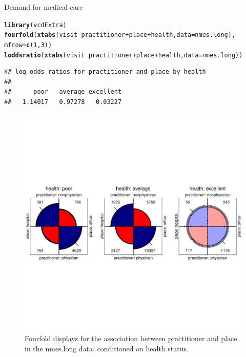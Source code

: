 \documentclass[11pt]{book}\usepackage[]{graphicx}\usepackage[]{color}
\makeatletter
\newcommand{\hlnum}[1]{\textcolor[rgb]{0.686,0.059,0.569}{#1}}%
\newcommand{\hlopt}[1]{\textcolor[rgb]{0,0,0}{#1}}%
\newcommand{\hlstd}[1]{\textcolor[rgb]{0.345,0.345,0.345}{#1}}%
\newcommand{\hlkwc}[1]{\textcolor[rgb]{0.333,0.667,0.333}{#1}}%
\newcommand{\hlkwd}[1]{\textcolor[rgb]{0.737,0.353,0.396}{\textbf{#1}}}%
\newenvironment{kframe}{%
 \def\at@end@of@kframe{}%
 \ifinner\ifhmode%
  \def\at@end@of@kframe{\end{minipage}}%
  \begin{minipage}{\columnwidth}%
 \fi\fi%
 \def\FrameCommand##1{\hskip\@totalleftmargin \hskip-\fboxsep
 \colorbox{shadecolor}{##1}\hskip-\fboxsep
     \hskip-\linewidth \hskip-\@totalleftmargin \hskip\columnwidth}%
 \MakeFramed {\advance\hsize-\width
   \@totalleftmargin\z@ \linewidth\hsize
   \@setminipage}}%
 {\par\unskip\endMakeFramed%
 \at@end@of@kframe}
\newenvironment{knitrout}{}{} %
\renewenvironment{knitrout}{\small\renewcommand{\baselinestretch}{.85}}{} %
\makeatother
\begin{document}
\begin{Example}[nmes4]{Demand for medical care}
\begin{knitrout}
\color{fgcolor}\begin{kframe}
\begin{alltt}
\hlkwd{library}\hlstd{(vcdExtra)}
\hlkwd{fourfold}\hlstd{(}\hlkwd{xtabs}\hlstd{(visit} \hlopt{~} \hlstd{practitioner} \hlopt{+} \hlstd{place} \hlopt{+} \hlstd{health,} \hlkwc{data}\hlstd{=nmes.long),}
         \hlkwc{mfrow}\hlstd{=}\hlkwd{c}\hlstd{(}\hlnum{1}\hlstd{,}\hlnum{3}\hlstd{))}
\hlkwd{loddsratio}\hlstd{(}\hlkwd{xtabs}\hlstd{(visit} \hlopt{~} \hlstd{practitioner} \hlopt{+} \hlstd{place} \hlopt{+} \hlstd{health,} \hlkwc{data}\hlstd{=nmes.long))}
\end{alltt}
\begin{verbatim}
## log odds ratios for practitioner and place by health 
## 
##      poor   average excellent 
##   1.14017   0.97278   0.03227
\end{verbatim}
\end{kframe}\begin{figure}[!htbp]


\centerline{\includegraphics[width=\textwidth,trim=0 130 0 130,clip]{ch09/fig/nmes4-fourfold1} }

\caption[Fourfold displays for the association between practitioner and place in the nmes]{Fourfold displays for the association between practitioner and place in the nmes.long data, conditioned on health status.\label{fig:nmes4-fourfold1}}
\end{figure}



\end{knitrout}
\end{Example}
\end{document}
